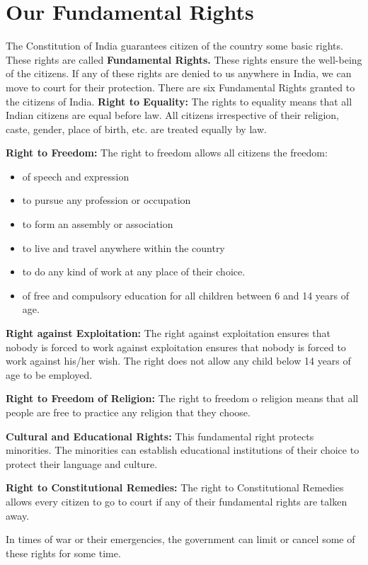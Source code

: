 \section{Our Fundamental Rights}
The Constitution of India guarantees citizen of the country some basic rights. These rights are called \textbf{Fundamental Rights.} These rights ensure the well-being of the citizens. If any of these rights are denied to us anywhere in India, we can move to court for their protection. There are six Fundamental Rights granted to the citizens of India.
\vspace{1.1in}
\textbf{Right to Equality:} The rights to equality means that all Indian citizens are equal before law. All citizens irrespective of their religion, caste, gender, place of birth, etc. are treated equally by law.
\vspace{0.1in}
\par
\textbf{Right to Freedom:} The right to freedom allows all citizens the freedom:
\begin{itemize}
    \item of speech and expression
    \item to pursue any profession or occupation
    \item to form an assembly or association
    \item to live and travel anywhere within the country
    \item to do any kind of work at any place of their choice.
    \item of free and compulsory education for all children between 6 and 14 years of age.
\end{itemize}
\textbf{Right against Exploitation:} The right against exploitation ensures that nobody is forced to work against exploitation ensures that nobody is forced to work against his/her wish. The right does not allow any child below 14 years of age to be employed.
\vspace{0.1in}
\par
\textbf{Right to Freedom of Religion:} The right to freedom o religion means that all people are free to practice any religion that they choose.
\vspace{0.1in}
\par
\textbf{Cultural and Educational Rights:} This fundamental right protects minorities. The minorities can establish educational institutions of their choice to protect their language and culture.
\vspace{0.1in}
\par
\textbf{Right to Constitutional Remedies:} The right to Constitutional Remedies allows every citizen to go to court if any of their fundamental rights are talken away.
\par
In times of war or their emergencies, the government can limit or cancel some of these rights for some time.
\vspace{1.3in}
